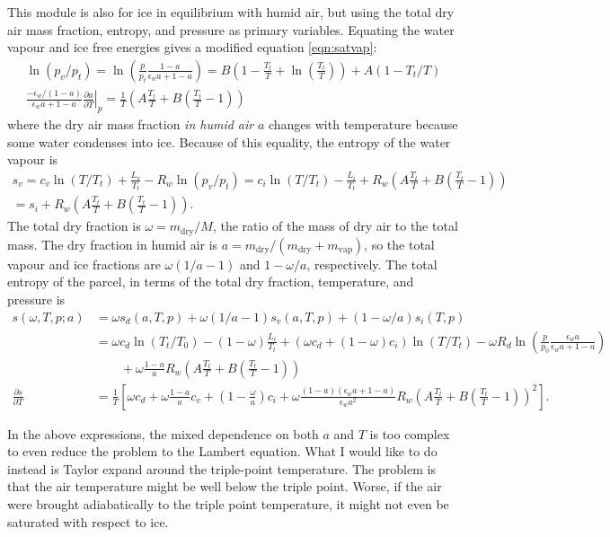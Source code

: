 \documentclass{article}
\newcommand{\vap}{\text{vap}}
\newcommand{\dry}{\text{dry}}
\newcommand{\epsw}{\epsilon_w}
\begin{document}
This module is also for ice in equilibrium with humid air, but using the total dry air mass fraction, entropy, and pressure as primary variables. Equating the water vapour and ice free energies gives a modified equation \ref{eqn:satvap}:
\begin{gather*}
    \ln(p_v/p_t) = \ln\left( \frac{p}{p_t} \frac{1-a}{\epsw a + 1-a} \right) = B \left( 1 - \frac{T_t}{T} + \ln\left( \frac{T_t}{T} \right) \right) + A (1 - T_t/T) \\
    \frac{-\epsw/(1-a)}{\epsw a + 1-a} \left. \frac{\partial a}{\partial T} \right|_p = \frac{1}{T} \left( A \frac{T_t}{T} + B \left( \frac{T_t}{T} - 1 \right) \right)
\end{gather*}
where the dry air mass fraction \textit{in humid air} $a$ changes with temperature because some water condenses into ice. Because of this equality, the entropy of the water vapour is
\begin{gather*}
    s_v = c_v \ln(T/T_t) + \frac{L_v}{T_t} - R_w \ln(p_v/p_t) = c_i \ln(T/T_t) - \frac{L_i}{T_t} + R_w \left( A \frac{T_t}{T} + B \left( \frac{T_t}{T} - 1 \right) \right) \\
    = s_i + R_w \left( A \frac{T_t}{T} + B \left( \frac{T_t}{T} - 1 \right) \right).
\end{gather*}
The total dry fraction is $\omega = m_{\dry}/M$, the ratio of the mass of dry air to the total mass. The dry fraction in humid air is $a = m_{\dry}/(m_{\dry}+m_{\vap})$, so the total vapour and ice fractions are $\omega (1/a-1)$ and $1-\omega/a$, respectively. The total entropy of the parcel, in terms of the total dry fraction, temperature, and pressure is
\begin{align*}
    s(\omega,T,p;a) &= \omega s_d(a,T,p) + \omega (1/a-1) s_v(a,T,p) + (1-\omega/a) s_i(T,p) \\
    &= \omega c_d \ln(T_t/T_0) - (1-\omega) \frac{L_i}{T_t} + (\omega c_d + (1-\omega) c_i) \ln(T/T_t) - \omega R_d \ln\left( \frac{p}{p_0} \frac{\epsw a}{\epsw a + 1-a} \right) \\
    &\qquad + \omega \frac{1-a}{a} R_w \left( A \frac{T_t}{T} + B \left( \frac{T_t}{T} - 1 \right) \right) \\
    \frac{\partial s}{\partial T} &= \frac{1}{T} \left[ \omega c_d + \omega \frac{1-a}{a} c_v + \left( 1 - \frac{\omega}{a} \right) c_i + \omega \frac{(1-a) (\epsw a + 1-a)}{\epsw a^2} R_w \left( A \frac{T_t}{T} + B \left( \frac{T_t}{T} - 1 \right) \right)^2 \right].
\end{align*}

In the above expressions, the mixed dependence on both $a$ and $T$ is too complex to even reduce the problem to the Lambert equation. What I would like to do instead is Taylor expand around the triple-point temperature. The problem is that the air temperature might be well below the triple point. Worse, if the air were brought adiabatically to the triple point temperature, it might not even be saturated with respect to ice.
\end{document}
